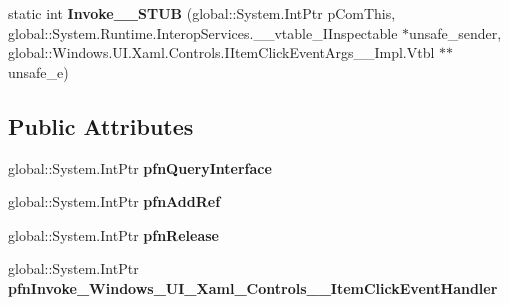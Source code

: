 \begin{DoxyCompactItemize}
\item 
\mbox{\label{struct_windows_1_1_u_i_1_1_xaml_1_1_controls_1_1_item_click_event_handler_____impl_1_1_vtbl_adfcdf0da029e56f3f474a6e2beca6f9c}} 
static int {\bfseries Invoke\+\_\+\+\_\+\+S\+T\+UB} (global\+::\+System.\+Int\+Ptr p\+Com\+This, global\+::\+System.\+Runtime.\+Interop\+Services.\+\_\+\+\_\+vtable\+\_\+\+I\+Inspectable $\ast$unsafe\+\_\+sender, global\+::\+Windows.\+U\+I.\+Xaml.\+Controls.\+I\+Item\+Click\+Event\+Args\+\_\+\+\_\+\+Impl.\+Vtbl $\ast$$\ast$unsafe\+\_\+e)
\end{DoxyCompactItemize}
\subsection*{Public Attributes}
\begin{DoxyCompactItemize}
\item 
\mbox{\label{struct_windows_1_1_u_i_1_1_xaml_1_1_controls_1_1_item_click_event_handler_____impl_1_1_vtbl_a6cf4282bc5826ce990493e9164f5a64e}} 
global\+::\+System.\+Int\+Ptr {\bfseries pfn\+Query\+Interface}
\item 
\mbox{\label{struct_windows_1_1_u_i_1_1_xaml_1_1_controls_1_1_item_click_event_handler_____impl_1_1_vtbl_a3b2a53fc1c015c09db8d9f6be8aa9e84}} 
global\+::\+System.\+Int\+Ptr {\bfseries pfn\+Add\+Ref}
\item 
\mbox{\label{struct_windows_1_1_u_i_1_1_xaml_1_1_controls_1_1_item_click_event_handler_____impl_1_1_vtbl_a9d339a3c98f35196c4adaccf562be210}} 
global\+::\+System.\+Int\+Ptr {\bfseries pfn\+Release}
\item 
\mbox{\label{struct_windows_1_1_u_i_1_1_xaml_1_1_controls_1_1_item_click_event_handler_____impl_1_1_vtbl_ad1f44d929895dd27d3275e688b80620f}} 
global\+::\+System.\+Int\+Ptr {\bfseries pfn\+Invoke\+\_\+\+Windows\+\_\+\+U\+I\+\_\+\+Xaml\+\_\+\+Controls\+\_\+\+\_\+\+Item\+Click\+Event\+Handler}
\end{DoxyCompactItemize}
